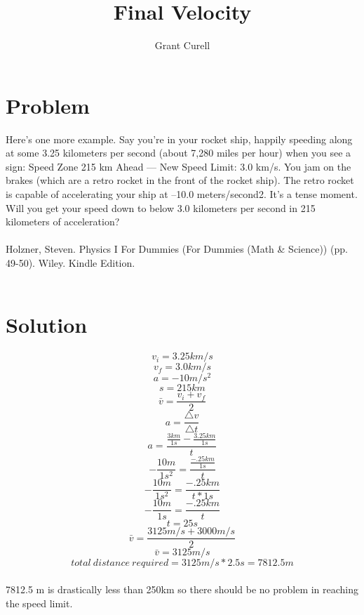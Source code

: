 \documentclass{article}
\title{Final Velocity}
\author{Grant Curell}
\begin{document}
\maketitle{}
\section{Problem}
Here’s one more example. Say you’re in your rocket ship, happily speeding along at some 3.25 kilometers per second (about 7,280 miles per hour) when you see a sign: Speed Zone 215 km Ahead — New Speed Limit: 3.0 km/s. You jam on the brakes (which are a retro rocket in the front of the rocket ship). The retro rocket is capable of accelerating your ship at –10.0 meters/second2. It’s a tense moment. Will you get your speed down to below 3.0 kilometers per second in 215 kilometers of acceleration?
\\\\
Holzner, Steven. Physics I For Dummies (For Dummies (Math \& Science)) (pp. 49-50). Wiley. Kindle Edition.
\\\\
\section{Solution}
\[ v_i=3.25km/s \]
\[ v_f=3.0km/s \]
\[ a=-10m/s^2 \]
\[ s=215km \]
\[ \bar{v}=\frac{v_i+v_f}{2} \]
\[ a=\frac{\triangle{v}}{\triangle{t}} \]
\[ a=\frac{\frac{3km}{1s}-\frac{3.25km}{1s}}{t} \]
\[-\frac{10m}{1s^2}=\frac{\frac{-.25km}{1s}}{t} \]
\[-\frac{10m}{1s^2}=\frac{-.25km}{t*1s} \]
\[-\frac{10m}{1s}=\frac{-.25km}{t} \]
\[t=25s\]
\[ \bar{v}=\frac{3125m/s+3000m/s}{2} \]
\[ \bar{v}=3125m/s \]
\[ total\ distance\ required = 3125m/s * 2.5s = 7812.5m \]
\\
7812.5 m is drastically less than 250km so there should be no problem in reaching the speed limit.
\end{document}
